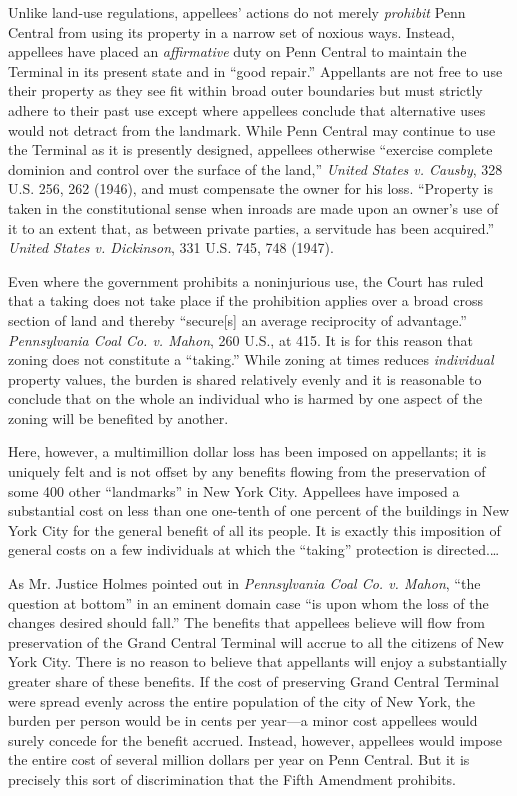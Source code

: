 Unlike land-use regulations, appellees' actions do not merely \textit{prohibit}
Penn Central from using its property in a narrow set of noxious ways. Instead,
appellees have placed an \textit{affirmative} duty on Penn Central to maintain
the Terminal in its present state and in ``good repair.'' Appellants are not
free to use their property as they see fit within broad outer boundaries but
must strictly adhere to their past use except where appellees conclude that
alternative uses would not detract from the landmark. While Penn Central may
continue to use the Terminal as it is presently designed, appellees otherwise
``exercise complete dominion and control over the surface of the land,''
\textit{United States v. Causby}, 328 U.S. 256, 262 (1946), and must compensate
the owner for his loss. ``Property is taken in the constitutional sense when
inroads are made upon an owner's use of it to an extent that, as between private
parties, a servitude has been acquired.'' \textit{United States v. Dickinson},
331 U.S. 745, 748 (1947).



Even where the government prohibits a noninjurious use, the Court has ruled that
a taking does not take place if the prohibition applies over a broad cross
section of land and thereby ``secure[s] an average reciprocity of advantage.''
\textit{Pennsylvania Coal Co. v. Mahon}, 260 U.S., at 415. It is for this reason
that zoning does not constitute a ``taking.'' While zoning at times reduces
\textit{individual} property values, the burden is shared relatively evenly and
it is reasonable to conclude that on the whole an individual who is harmed by
one aspect of the zoning will be benefited by another.

Here, however, a multimillion dollar loss has been imposed on appellants; it is
uniquely felt and is not offset by any benefits flowing from the preservation of
some 400 other ``landmarks'' in New York City. Appellees have imposed a
substantial cost on less than one one-tenth of one percent of the buildings in
New York City for the general benefit of all its people. It is exactly this
imposition of general costs on a few individuals at which the ``taking''
protection is directed.\ldots

As Mr. Justice Holmes pointed out in \textit{Pennsylvania Coal Co. v. Mahon},
``the question at bottom'' in an eminent domain case ``is upon whom the loss of
the changes desired should fall.'' The benefits that appellees believe will flow
from preservation of the Grand Central Terminal will accrue to all the citizens
of New York City. There is no reason to believe that appellants will enjoy a
substantially greater share of these benefits. If the cost of preserving Grand
Central Terminal were spread evenly across the entire population of the city of
New York, the burden per person would be in cents per year---a minor cost
appellees would surely concede for the benefit accrued. Instead, however,
appellees would impose the entire cost of several million dollars per year on
Penn Central. But it is precisely this sort of discrimination that the Fifth
Amendment prohibits.

